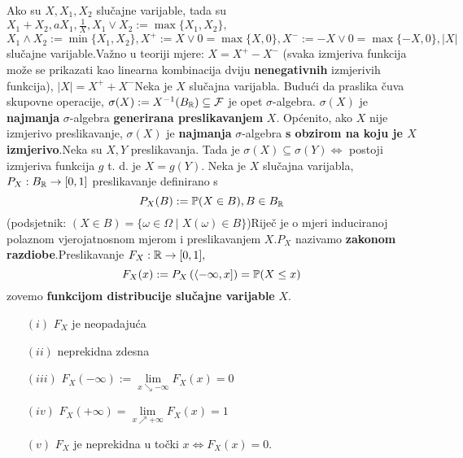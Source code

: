 \documentclass{article}
\begin{document}
Ako su \(X,X_1,X_2\) slučajne varijable, tada su \(X_1+X_2,aX_1,\frac1X,X_1\vee X_2:=\max\{X_1,X_2\},\)\newline\(X_1\wedge X_2:=\min\{X_1,X_2\},X^+:=X\vee 0=\max\{X,0\}, X^-:=-X\vee 0=\max\{-X,0\},|X|\) slučajne varijable.\newline Važno u teoriji mjere: \(\boxed{X=X^+-X^-}\) (svaka izmjeriva funkcija može se prikazati kao linearna kombinacija dviju \textbf{nenegativnih} izmjerivih funkcija), \(\boxed{|X|=X^++X^-}\)\newline Neka je \(X\) slučajna varijabla. Budući da praslika čuva skupovne operacije, \(\sigma(X):=X^{-1}(B_{\Bbb R})\subseteq\mathcal F\) je opet \(\sigma\)-algebra. \(\sigma(X)\) je \textbf{najmanja} \(\sigma\)-algebra \textbf{generirana preslikavanjem} \(X.\) Općenito, ako \(X\) nije izmjerivo preslikavanje, \(\sigma(X)\) je \textbf{najmanja} \(\sigma\)-algebra \textbf{s obzirom na koju je \(X\) izmjerivo}.\newline Neka su \(X,Y\) preslikavanja. Tada je \(\sigma(X)\subseteq\sigma(Y)\Leftrightarrow\) postoji izmjeriva funkcija \(g\) t. d. je \(X=g(Y).\)\newline\newline
Neka je \(X\) slučajna varijabla, \(P_X:B_{\Bbb R}\to[0,1]\) preslikavanje definirano s \[P_X(B):=\Bbb P(X\in B),B\in B_{\Bbb R}\] (podsjetnik: \((X\in B)=\{\omega\in\Omega\mid X(\omega)\in B\}\))\newline Riječ je o mjeri induciranoj polaznom vjerojatnosnom mjerom i preslikavanjem \(X.\)\newline \(P_X\) nazivamo \textbf{zakonom razdiobe}.\newpage Preslikavanje \(F_X:\Bbb R\to [0,1],\) \[F_X(x):=P_X\left(\langle-\infty,x]\right)=\Bbb P(X\le x)\] zovemo \textbf{funkcijom distribucije slučajne varijable} \(X.\)
\begin{itemize}
    \item[\((i)\)] \(F_X\) je neopadajuća
    \item[\((ii)\)] neprekidna zdesna
    \item[\((iii)\)] \(F_X(-\infty):=\lim\limits_{x\searrow-\infty}F_X(x)=0\)
    \item[\((iv)\)] \(F_X(+\infty)=\lim\limits_{x\nearrow+\infty}F_X(x)=1\)
    \item[\((v)\)] \(F_X\) je neprekidna u točki \(x\Leftrightarrow F_X(x)=0.\)
\end{itemize}
\end{document}
